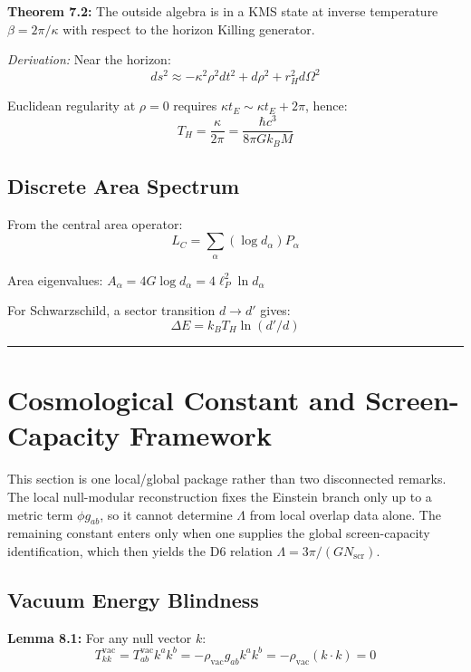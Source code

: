 \textbf{Theorem 7.2:} The outside algebra is in a KMS state at inverse temperature \(\beta = 2\pi/\kappa\) with respect to the horizon Killing generator.

\emph{Derivation:} Near the horizon: \[ds^2 \approx -\kappa^2 \rho^2 dt^2 + d\rho^2 + r_H^2 d\Omega^2\]

Euclidean regularity at \(\rho = 0\) requires \(\kappa t_E \sim \kappa t_E + 2\pi\), hence: \[T_H = \frac{\kappa}{2\pi} = \frac{\hbar c^3}{8\pi G k_B M}\]

\subsection{Discrete Area Spectrum}\label{75-discrete-area-spectrum}

From the central area operator: \[L_C = \sum_\alpha (\log d_\alpha) P_\alpha\]

Area eigenvalues: \(A_\alpha = 4G \log d_\alpha = 4\ell_P^2 \ln d_\alpha\)

For Schwarzschild, a sector transition \(d \to d'\) gives: \[\Delta E = k_B T_H \ln(d'/d)\]

\begin{center}\rule{0.5\linewidth}{0.5pt}\end{center}

\section{Cosmological Constant and Screen-Capacity Framework}\label{8-the-cosmological-constant-problem}

This section is one local/global package rather than two disconnected remarks. The local null-modular reconstruction fixes the Einstein branch only up to a metric term \(\phi g_{ab}\), so it cannot determine \(\Lambda\) from local overlap data alone. The remaining constant enters only when one supplies the global screen-capacity identification, which then yields the D6 relation \(\Lambda = 3\pi/(G N_{\mathrm{scr}})\).

\subsection{Vacuum Energy Blindness}\label{81-vacuum-energy-blindness}

\textbf{Lemma 8.1:} For any null vector \(k\): \[T^{\text{vac}}_{kk} = T^{\text{vac}}_{ab} k^a k^b = -\rho_{\text{vac}} g_{ab} k^a k^b = -\rho_{\text{vac}}(k \cdot k) = 0\]

